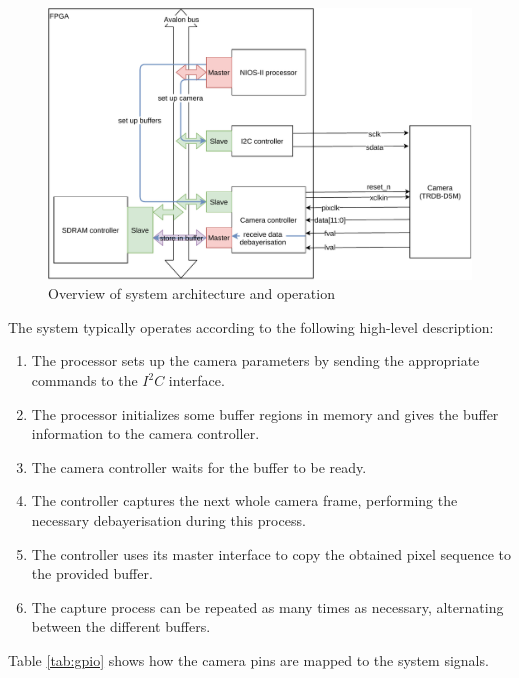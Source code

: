 \documentclass[12pt,a4paper]{article}
\begin{document}
\begin{figure}[h]
	\centering
	\includegraphics[width=\textwidth]{figures/system}
	\caption{Overview of system architecture and operation}
	\label{fig:system}
\end{figure}

The system typically operates according to the following high-level description:
\begin{enumerate}[nosep]
	\item The processor sets up the camera parameters by sending the appropriate commands to the $I^2C$ interface.
	\item The processor initializes some buffer regions in memory and gives the buffer information to the camera controller.
	\item The camera controller waits for the buffer to be ready.
	\item The controller captures the next whole camera frame, performing the necessary debayerisation during this process.
	\item The controller uses its master interface to copy the obtained pixel sequence to the provided buffer.
	\item The capture process can be repeated as many times as necessary, alternating between the different buffers.
\end{enumerate}

Table \ref{tab:gpio} shows how the camera pins are mapped to the system signals.
\end{document}
